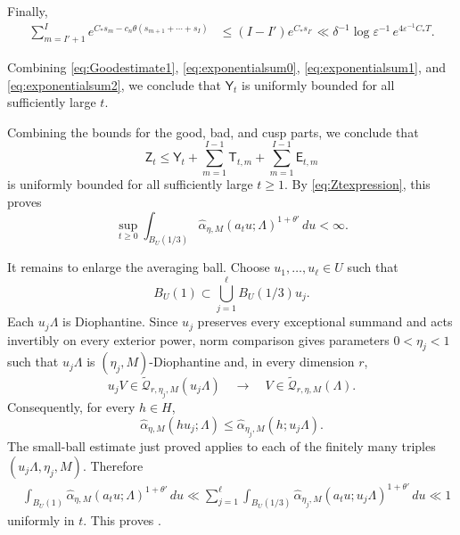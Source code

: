 \documentclass[reqno,11pt]{amsart}
\numberwithin{equation}{section}
\theoremstyle{definition}
\theoremstyle{remark}
\begin{document}
Finally,
\begin{equation}\label{eq:exponentialsum2}
\begin{aligned}
\sum_{m=I'+1}^{I}
e^{C_*s_m-c_n\theta(s_{m+1}+\cdots+s_I)}
&\le
(I-I')e^{C_*s_{I'}}
\ll
\delta^{-1}\log \varepsilon^{-1} \,
e^{4\varepsilon^{-1}C_*T}.
\end{aligned}
\end{equation}

Combining \eqref{eq:Goodestimate1}, \eqref{eq:exponentialsum0},
\eqref{eq:exponentialsum1}, and \eqref{eq:exponentialsum2}, we conclude that
$\mathsf Y_{t}$ is uniformly bounded for all sufficiently large
$t$.


Combining the bounds for the good, bad, and cusp parts, we conclude that
$$
\mathsf Z_{t}
\leq 
\mathsf Y_{t}+\sum_{m=1}^{I-1}\mathsf T_{t,m}+\sum_{m=1}^{I-1}\mathsf E_{t,m}
$$
is uniformly bounded for all sufficiently large $t\ge1$.
By \eqref{eq:Ztexpression}, this proves
$$
\sup_{t\ge0}
\int_{B_{U}(1/3)}
\widehat\alpha_{\eta,M}(a_tu;\Lambda)^{1+\theta'}\,du
<\infty.
$$

It remains to enlarge the averaging ball. Choose
$u_1,\ldots,u_\ell\in U$ such that
$$
B_{U}(1)\subset\bigcup_{j=1}^{\ell}B_{U}(1/3)u_j.
$$
Each $u_j\Lambda$ is Diophantine. Since $u_j$ preserves every exceptional
summand and acts invertibly on every exterior power, norm comparison gives
parameters $0<\eta_j<1$ such that $u_j\Lambda$ is
$(\eta_{j},M)$-Diophantine and, in every dimension $r$,
$$
u_jV\in
\widetilde{\mathscr Q}_{r,\eta_j,M}(u_j\Lambda)
\quad\to\quad
V\in\widetilde{\mathscr Q}_{r,\eta,M}(\Lambda).
$$
Consequently, for every $h\in H$,
$$
\widehat\alpha_{\eta,M}(hu_j;\Lambda)
\le
\widehat\alpha_{\eta_j,M}(h;u_j\Lambda).
$$
The small-ball estimate just proved applies to each of the finitely many
triples $(u_j\Lambda,\eta_j,M)$. Therefore
$$
\begin{aligned}
&\int_{B_{U}(1)}
\widehat\alpha_{\eta,M}(a_tu;\Lambda)^{1+\theta'}\,du \ll
\sum_{j=1}^{\ell}
\int_{B_{U}(1/3)}
\widehat\alpha_{\eta_j,M}(a_tu;u_j\Lambda)^{1+\theta'}\,du
\ll1
\end{aligned}
$$
uniformly in $t$.
This proves .
\end{document}
